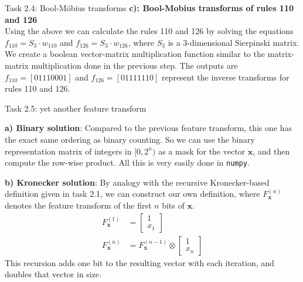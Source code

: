 \documentclass[aspectratio=169]{beamer}
\begin{document}
\begin{frame}{Task 2.4: Bool-Möbius transforms}
\textbf{c): Bool-Mobius transforms of rules 110 and 126}\\
Using the above we can calculate the rules 110 and 126 by solving the equations \( f_{110} = S_3 \cdot w_{110} \) and \( f_{126} = S_3 \cdot w_{126} \), where \( S_3 \) is a 3-dimensional Sierpinski matrix. We create a boolean vector-matrix multiplication function similar to the matrix-matrix multiplication done in the previous step.
The outputs are \( f_{110} = [0 1 1 1 0 0 0 1] \) and \( f_{126} = [0 1 1 1 1 1 1 0] \) represent the inverse transforms for rules 110 and 126.

\end{frame}

\begin{frame}{Task 2.5: yet another feature transform}

\textbf{a) Binary solution}:
Compared to the previous feature transform, this one has the exact same ordering as binary counting. So we can use the binary representation matrix of integers in $[0,2^n)$ as a mask for the vector $\mathbf{x}$, and then compute the row-wise product. All this is very easily done in \texttt{numpy}.
\vspace{.6cm}

\textbf{b) Kronecker solution}:
By analogy with the recursive Kronecker-based definition given in task 2.1, we can construct our own definition, where $F_\mathbf{x}^{(n)}$ denotes the feature transform of the first $n$ bits of $\mathbf{x}$.
\begin{align*}
    F_\mathbf{x}^{(1)} &= \begin{bmatrix} 1 \\ x_1 \end{bmatrix} \\
    F_\mathbf{x}^{(n)} &= F_\mathbf{x}^{(n-1)} \otimes \begin{bmatrix} 1 \\ x_n \end{bmatrix}
\end{align*}
This recursion adds one bit to the resulting vector with each iteration, and doubles that vector in size.

\end{frame}
\end{document}
